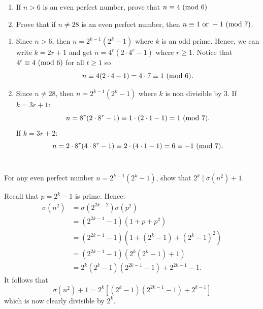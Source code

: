 \begin{exercise}
    \begin{enumerate}
        \item If $n > 6$ is an even perfect number, prove that $n \equiv 4 \ (\mathrm{mod}\ 6)$ 
        \item Prove that if $n \neq 28$ is an even perfect number, then $n \equiv 1 \text{ or } -1 \ (\mathrm{mod}\ 7)$. \\
    \end{enumerate}
\end{exercise}

\begin{solution}
    \begin{enumerate}
        \item Since $n > 6$, then $n = 2^{k-1}(2^k - 1)$ where $k$ is an odd prime. Hence, we can write $k = 2r+ 1$ and get $n = 4^r(2\cdot 4^r - 1)$ where $r \geq 1$. Notice that $4^t \equiv 4 \ (\mathrm{mod}\ 6)$ for all $t \geq 1$ so 
        $$n \equiv 4(2\cdot 4 - 1) = 4\cdot 7 \equiv 1 \ (\mathrm{mod}\ 6).$$
        \item Since $n \neq 28$, then $n = 2^{k-1}(2^k - 1)$ where $k$ is non divisible by 3. If $k = 3r + 1$:
        $$n = 8^r(2\cdot 8^r - 1) \equiv 1\cdot (2 \cdot 1 - 1) = 1\ (\mathrm{mod}\ 7).$$
        If $k = 3r + 2$:
        $$n = 2\cdot8^r(4\cdot 8^r - 1) \equiv 2\cdot (4\cdot 1 - 1) = 6 \equiv -1 \ (\mathrm{mod}\ 7).$$ \\
    \end{enumerate}
\end{solution}

\begin{exercise}
    For any even perfect number $n = 2^{k-1}(2^k - 1)$, show that $2^k \mid \sigma(n^2) + 1$. \\
\end{exercise}

\begin{solution}
    Recall that $p = 2^k - 1$ is prime. Hence:
    \begin{align*}
        \sigma(n^2) &= \sigma(2^{2k - 2})\sigma(p^2) \\
        &= (2^{2k - 1} - 1)(1 + p + p^2) \\
        &= (2^{2k - 1} - 1)(1 + (2^k - 1) + (2^k - 1)^2) \\
        &= (2^{2k - 1} - 1)(2^k(2^k - 1) + 1) \\
        &= 2^k(2^k - 1)(2^{2k - 1} - 1) + 2^{2k - 1} - 1.
    \end{align*}
    It follows that 
    $$\sigma(n^2) + 1 = 2^k\left[(2^k - 1)(2^{2k - 1} - 1) + 2^{k - 1}\right]$$
    which is now clearly divisible by $2^k$. \\
\end{solution}

